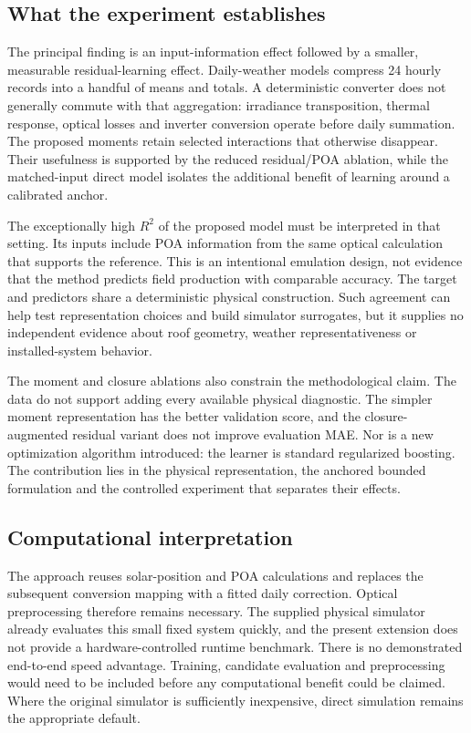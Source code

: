 \documentclass[11pt,a4paper]{article}
\begin{document}
\subsection{What the experiment establishes}
The principal finding is an input-information effect followed by a smaller, measurable residual-learning effect. Daily-weather models compress 24 hourly records into a handful of means and totals. A deterministic converter does not generally commute with that aggregation: irradiance transposition, thermal response, optical losses and inverter conversion operate before daily summation. The proposed moments retain selected interactions that otherwise disappear. Their usefulness is supported by the reduced residual/POA ablation, while the matched-input direct model isolates the additional benefit of learning around a calibrated anchor.

The exceptionally high $R^2$ of the proposed model must be interpreted in that setting. Its inputs include POA information from the same optical calculation that supports the reference. This is an intentional emulation design, not evidence that the method predicts field production with comparable accuracy. The target and predictors share a deterministic physical construction. Such agreement can help test representation choices and build simulator surrogates, but it supplies no independent evidence about roof geometry, weather representativeness or installed-system behavior.

The moment and closure ablations also constrain the methodological claim. The data do not support adding every available physical diagnostic. The simpler moment representation has the better validation score, and the closure-augmented residual variant does not improve evaluation MAE. Nor is a new optimization algorithm introduced: the learner is standard regularized boosting. The contribution lies in the physical representation, the anchored bounded formulation and the controlled experiment that separates their effects.

\subsection{Computational interpretation}
The approach reuses solar-position and POA calculations and replaces the subsequent conversion mapping with a fitted daily correction. Optical preprocessing therefore remains necessary. The supplied physical simulator already evaluates this small fixed system quickly, and the present extension does not provide a hardware-controlled runtime benchmark. There is no demonstrated end-to-end speed advantage. Training, candidate evaluation and preprocessing would need to be included before any computational benefit could be claimed. Where the original simulator is sufficiently inexpensive, direct simulation remains the appropriate default.
\end{document}

